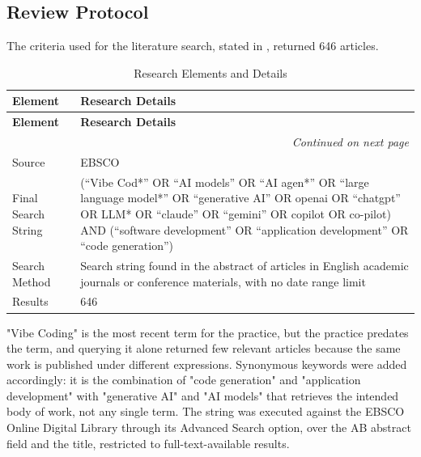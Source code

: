 \subsection{Review Protocol}
The criteria used for the literature search, stated in , returned 646 articles.

{\small
\centering

\begin{longtable}{p{2.8cm} p{12.2cm}}
\caption{Research Elements and Details}
\label{tab:review_protocol} \\
\toprule
\textbf{Element} & \textbf{Research Details} \\
\midrule
\endfirsthead

\toprule
\textbf{Element} & \textbf{Research Details} \\
\midrule
\endhead

\midrule
\multicolumn{2}{r}{\textit{Continued on next page}} \\
\bottomrule
\endfoot

\bottomrule
\endlastfoot

Source & EBSCO \\

\addlinespace
Final Search String &
(``Vibe Cod*'' OR ``AI models'' OR ``AI agen*'' OR ``large language model*'' OR ``generative AI'' OR openai OR ``chatgpt'' OR LLM* OR ``claude'' OR ``gemini'' OR copilot OR co-pilot) AND (``software development'' OR ``application development'' OR ``code generation'') \\
\addlinespace
Search Method & Search string found in the abstract of articles in English academic journals or conference materials, with no date range limit \\
\addlinespace
Results & 646 \\

\end{longtable}
}


"Vibe Coding" is the most recent term for the practice, but the practice predates the term, and querying it alone returned few relevant articles because the same work is published under different expressions. Synonymous keywords were added accordingly: it is the combination of "code generation" and "application development" with "generative AI" and "AI models" that retrieves the intended body of work, not any single term. The string was executed against the EBSCO Online Digital Library through its Advanced Search option, over the AB abstract field and the title, restricted to full-text-available results.

